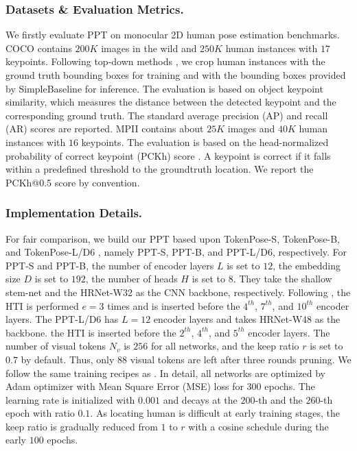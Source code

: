 \documentclass[runningheads]{llncs}
\begin{document}
\subsubsection{Datasets \& Evaluation Metrics. } 
We firstly evaluate PPT on monocular 2D human pose estimation benchmarks. 
COCO \cite{lin2014microsoft} contains $200K$ images in the wild and $250K$ human instances with $17$ keypoints. Following top-down methods \cite{xiao2018simple,sun2019deep,li2021tokenpose}, we crop human instances with the ground truth bounding boxes for training and with the bounding boxes provided by SimpleBaseline \cite{xiao2018simple} for inference.   
The evaluation is based on object keypoint similarity, which measures the distance between the detected keypoint and the corresponding ground truth. The standard average precision (AP) and recall (AR) scores are reported.  
MPII \cite{andriluka14cvpr} contains about $25K$ images and $40K$ human instances with $16$ keypoints. The evaluation is based on the head-normalized probability of correct keypoint (PCKh) score \cite{andriluka14cvpr}. 
A keypoint is correct if it falls within a predefined threshold to the groundtruth location. We report the PCKh@0.5 score by convention.


\vspace{-0.5em}
\subsubsection{Implementation Details. } 
For fair comparison, we build our PPT based upon TokenPose-S, TokenPose-B, and TokenPose-L/D6 \cite{li2021tokenpose}, namely PPT-S, PPT-B, and PPT-L/D6, respectively. 
For PPT-S and PPT-B, the number of encoder layers $L$ is set to $12$, the embedding size $D$ is set to $192$, the number of heads $H$ is set to $8$. 
They take the shallow stem-net and the HRNet-W32 as the CNN backbone, respectively.  
Following \cite{rao2021dynamicvit,liang2022evit}, the HTI is performed $e=3$ times and is inserted before the $4^{th}$, $7^{th}$, and $10^{th}$ encoder layers. 
The PPT-L/D6 has $L=12$ encoder layers and takes HRNet-W48 as the backbone. the HTI is inserted before the $2^{th}$, $4^{th}$, and $5^{th}$ encoder layers. 
The number of visual tokens $N_v$ is $256$ for all networks, and the keep ratio $r$ is set to $0.7$ by default. Thus, only $88$ visual tokens are left after three rounds pruning.
We follow the same training recipes as \cite{li2021tokenpose}. 
In detail, all networks are optimized by Adam optimizer \cite{kingma2014adam} with Mean Square Error (MSE) loss for $300$ epochs. 
The learning rate is initialized with $0.001$ and decays at the $200$-th and the $260$-th epoch with ratio $0.1$. 
As locating human is difficult at early training stages, the keep ratio is gradually reduced from $1$ to $r$ with a cosine schedule during the early $100$ epochs. 
\end{document}
